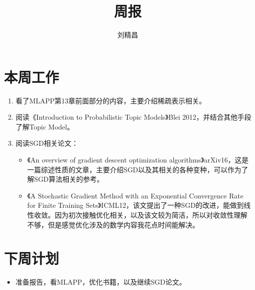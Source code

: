 \documentclass{ctexart}
\begin{document}
\title{周报}
\author{刘精昌}
\maketitle
\fangsong

\section*{本周工作}
\begin{enumerate}
  \item 看了MLAPP第13章前面部分的内容，主要介绍稀疏表示相关。
  \item 阅读《Introduction to Probabilistic Topic Models》Blei 2012，并结合其他手段了解Topic Model。
  \item 阅读SGD相关论文：
      \begin{itemize}
        \item 《An overview of gradient descent optimization algorithms》arXiv16，这是一篇综述性质的文章，主要介绍SGD以及其相关的各种变种，可以作为了解SGD算法相关的参考。
        \item 《A Stochastic Gradient Method with an Exponential Convergence Rate for Finite Training Sets》ICML12，该文提出了一种SGD的改进，能做到线性收敛。因为初次接触优化相关，以及该文较为简洁，所以对收敛性理解不够，但是感觉优化涉及的数学内容我花点时间能解决。
      \end{itemize}
\end{enumerate}

\section*{下周计划}
\begin{itemize}
  \item 准备报告，看MLAPP，优化书籍，以及继续SGD论文。
\end{itemize}
\end{document}

